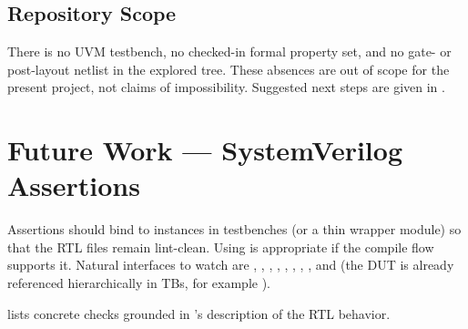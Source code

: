 \subsection{Repository Scope}
\label{sec:lim-scope}

There is no UVM testbench, no checked-in formal property set, and no
gate- or post-layout netlist in the explored tree. These absences are
out of scope for the present project, not claims of impossibility.
Suggested next steps are given in .

\section{Future Work --- SystemVerilog Assertions}
\label{sec:future-sva}

Assertions should bind to  instances in
testbenches (or a thin wrapper module) so that the RTL files remain
lint-clean. Using  is appropriate if the compile flow
supports it. Natural interfaces to watch are ,
, , , ,
, , , and
 (the DUT is already referenced hierarchically in
TBs, for example ).

 lists concrete checks grounded in
's description of the RTL behavior.

